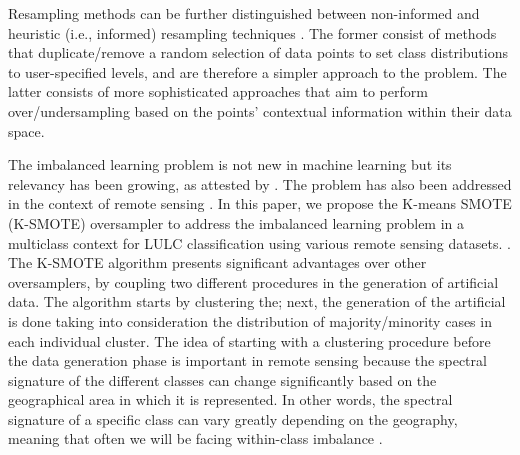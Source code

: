 \documentclass[remotesensing,article,submit,moreauthors,pdftex]{Definitions/mdpi}
\begin{document}
Resampling methods can be further distinguished between non-informed and
heuristic (i.e., informed) resampling techniques
\cite{Fernandez2013,Luengo2020,Garcia2016}. The former consist of methods that
duplicate/remove a random selection of data points to set class distributions
to user-specified levels, and are therefore a simpler approach to the problem.
The latter consists of more sophisticated approaches that aim to perform
over/undersampling based on the points' contextual information within their
data space.

The imbalanced learning problem is not new in machine learning but its
relevancy has been growing, as attested by \cite{Haixiang2017}. The problem
has also been addressed in the context of remote sensing \cite{Douzas2019rs}.
In this paper, we propose 
the K-means SMOTE (K-SMOTE) \cite{Douzas2018} oversampler\added{,} to address
the imbalanced learning problem in a multiclass context for LULC
classification using various remote sensing datasets. . The K-SMOTE algorithm
presents significant advantages over other oversamplers, by coupling two
different procedures in the generation of artificial data. The algorithm
starts by clustering the; next, the
generation of the artificial is done
taking into consideration the distribution of majority/minority cases in each
individual cluster. The idea of starting with a clustering procedure before
the data generation phase is important in remote sensing because the spectral
signature of the different classes can change significantly based on the
geographical area in which it is represented.  In other words, the spectral
signature of a specific class can vary greatly depending on the geography,
meaning that often we will be facing within-class imbalance
\cite{Japkowicz2001}.
\end{document}
